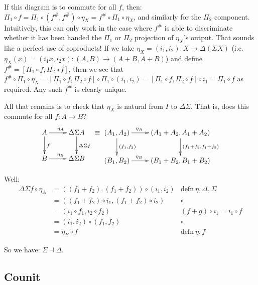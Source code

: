 \documentclass[letterpaper]{article}
\newcommand{\paren}[1]{\left({#1}\right)}
\newcommand{\brak}[1]{\left[{#1}\right]}
\begin{document}
If this diagram is to commute for all $f$, then: $\Pi_1 \circ f = \Pi_1
\circ (f^\#, f^\#) \circ \eta_X = f^\# \circ \Pi_1 \circ \eta_X$, and
similarly for the $\Pi_2$ component.  Intuitively, this can only work in the
case where $f^\#$ is able to discriminate whether it has been handed the
$\Pi_1$ or $\Pi_2$ projection of $\eta_X$'s output.  That sounds like a
perfect use of coproducts!  If we take $\eta_X = (i_1, i_2): X
\to \Delta (\Sigma X)$ (i.e. $\eta_X (x) = (i_1 x, i_2 x) : (A,B) \to (A +
B, A + B)$) and define $f^\# = \brak{\Pi_1 \circ f, \Pi_2 \circ f}$, then we
see that
$f^\# \circ \Pi_1 \circ \eta_X =
   \brak{\Pi_1 \circ f, \Pi_2 \circ f} \circ \Pi_1 \circ (i_1, i_2) =
   \brak{\Pi_1 \circ f, \Pi_2 \circ f} \circ i_1 =
   \Pi_1 \circ f
$ as required.  Any such $f^\#$ is clearly unique.

All that remains is to check that $\eta_X$ is natural from
$I$ to $\Delta \Sigma$.  That is, does this commute for all $f : A \to
B$?
\[ \xymatrix{
    A \ar[r]^{\eta_A} \ar[d]^f & \Delta \Sigma A \ar[d]^{\Delta \Sigma f} \\
    B \ar[r]^{\eta_B} & \Delta \Sigma B \\
} \equiv \xymatrix{
    (A_1, A_2) \ar[r]^(.35){\eta_A} \ar[d]^{(f_1,f_2)} & (A_1 + A_2, A_1 + A_2)
                                               \ar[d]^{(f_1 + f_2, f_1 + f_2)} \\
    (B_1, B_2) \ar[r]^(.35){\eta_B}          & (B_1 + B_2, B_1 + B_2) \\
} \]

Well:
\begin{align*}
  \Delta \Sigma f \circ \eta_A
    &= \paren{(f_1 + f_2), (f_1 + f_2)} \circ (i_1, i_2) & \text{defn}~\eta, \Delta, \Sigma \\
    &= ((f_1 + f_2) \circ i_1, (f_1 + f_2) \circ i_2)    & \circ \\
    &= (i_1 \circ f_1, i_2 \circ f_2)                    & (f + g) \circ i_1 = i_1 \circ f \\
    &= (i_1, i_2) \circ (f_1,f_2)                        & \circ \\
    &= \eta_B \circ f                                    & \text{defn}~\eta,f
\end{align*}

So we have: $\Sigma \dashv \Delta$.

\subsection{Counit}
\end{document}
